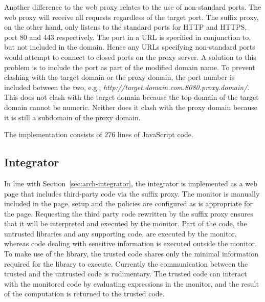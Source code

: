 \documentclass{llncs}
\newcommand{\todo}[1]{\colorbox{red}{\textcolor{white}{\sffamily\bfseries\scriptsize TODO}} \textcolor{red}{#1} \textcolor{red}{$\blacktriangleleft$}}
\begin{document}
Another difference to the web proxy relates to the use of non-standard ports.
The web proxy will receive all requests regardless of the target port. The 
suffix proxy, on the other hand, only listens to the standard ports for HTTP and HTTPS, port 80 and 
443 respectively. The port in a URL is specified in conjunction to, but not included in the domain.
Hence any URLs specifying non-standard ports would attempt to connect to closed 
ports on the proxy server. A solution to this problem is to include the port as part 
of the modified domain name. To prevent clashing with the target domain or the proxy domain, 
the port number is included between the two, e.g., \emph{http://target.domain.com.8080.proxy.domain/}.
This does not clash with the target domain because the top domain of the target domain cannot be numeric.
Neither does it clash with the proxy domain because it is still a subdomain of the proxy domain.

The implementation consists of 276 lines of JavaScript code.

\subsection{Integrator}


In line with Section~\ref{sec:arch-integrator}, the integrator is implemented as 
a web page that includes third-party code via the suffix proxy. The monitor is 
manually included in the page, setup and the policies are configured as is 
appropriate for the page. Requesting the third party code rewritten by the suffix 
proxy ensures that it will be interpreted and executed by the 
monitor.
%
Part of the code, the untrusted libraries and any supporting code,
are executed by the monitor, whereas code dealing with sensitive 
information is executed outside the monitor. To make use of the library, 
the trusted code shares only the minimal information required for the 
library to execute. Currently the communication between the trusted and the 
untrusted code is rudimentary. The trusted code can interact with the monitored 
code by evaluating expressions in the monitor, and the result of the computation
is returned to the trusted code. 
\end{document}
